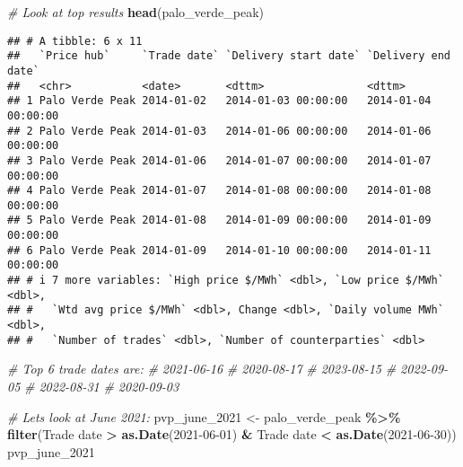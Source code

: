 \documentclass[
]{article}
\newenvironment{Shaded}{\begin{snugshade}}{\end{snugshade}}
\newcommand{\AttributeTok}[1]{\textcolor[rgb]{0.13,0.29,0.53}{#1}}
\newcommand{\CommentTok}[1]{\textcolor[rgb]{0.56,0.35,0.01}{\textit{#1}}}
\newcommand{\FunctionTok}[1]{\textcolor[rgb]{0.13,0.29,0.53}{\textbf{#1}}}
\newcommand{\NormalTok}[1]{#1}
\newcommand{\OtherTok}[1]{\textcolor[rgb]{0.56,0.35,0.01}{#1}}
\newcommand{\SpecialCharTok}[1]{\textcolor[rgb]{0.81,0.36,0.00}{\textbf{#1}}}
\newcommand{\StringTok}[1]{\textcolor[rgb]{0.31,0.60,0.02}{#1}}
\begin{document}
\begin{Shaded}
\begin{Highlighting}[]
\CommentTok{\# Look at top results}
\FunctionTok{head}\NormalTok{(palo\_verde\_peak)}
\end{Highlighting}
\end{Shaded}

\begin{verbatim}
## # A tibble: 6 x 11
##   `Price hub`     `Trade date` `Delivery start date` `Delivery end date`
##   <chr>           <date>       <dttm>                <dttm>             
## 1 Palo Verde Peak 2014-01-02   2014-01-03 00:00:00   2014-01-04 00:00:00
## 2 Palo Verde Peak 2014-01-03   2014-01-06 00:00:00   2014-01-06 00:00:00
## 3 Palo Verde Peak 2014-01-06   2014-01-07 00:00:00   2014-01-07 00:00:00
## 4 Palo Verde Peak 2014-01-07   2014-01-08 00:00:00   2014-01-08 00:00:00
## 5 Palo Verde Peak 2014-01-08   2014-01-09 00:00:00   2014-01-09 00:00:00
## 6 Palo Verde Peak 2014-01-09   2014-01-10 00:00:00   2014-01-11 00:00:00
## # i 7 more variables: `High price $/MWh` <dbl>, `Low price $/MWh` <dbl>,
## #   `Wtd avg price $/MWh` <dbl>, Change <dbl>, `Daily volume MWh` <dbl>,
## #   `Number of trades` <dbl>, `Number of counterparties` <dbl>
\end{verbatim}

\begin{Shaded}
\begin{Highlighting}[]
\CommentTok{\# Top 6 trade dates are:}
\CommentTok{\# 2021{-}06{-}16}
\CommentTok{\# 2020{-}08{-}17}
\CommentTok{\# 2023{-}08{-}15}
\CommentTok{\# 2022{-}09{-}05}
\CommentTok{\# 2022{-}08{-}31    }
\CommentTok{\# 2020{-}09{-}03}

\CommentTok{\# Let\textquotesingle{}s look at June 2021:}
\NormalTok{pvp\_june\_2021 }\OtherTok{\textless{}{-}}\NormalTok{ palo\_verde\_peak }\SpecialCharTok{\%\textgreater{}\%}
  \FunctionTok{filter}\NormalTok{(}\StringTok{\textasciigrave{}}\AttributeTok{Trade date}\StringTok{\textasciigrave{}} \SpecialCharTok{\textgreater{}} \FunctionTok{as.Date}\NormalTok{(}\StringTok{\textquotesingle{}2021{-}06{-}01\textquotesingle{}}\NormalTok{) }\SpecialCharTok{\&} \StringTok{\textasciigrave{}}\AttributeTok{Trade date}\StringTok{\textasciigrave{}} \SpecialCharTok{\textless{}} \FunctionTok{as.Date}\NormalTok{(}\StringTok{\textquotesingle{}2021{-}06{-}30\textquotesingle{}}\NormalTok{))}
\NormalTok{pvp\_june\_2021}
\end{Highlighting}
\end{Shaded}
\end{document}
